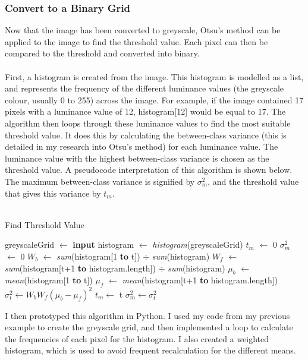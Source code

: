 \documentclass[titlepage]{article}
\begin{document}
\subsubsection{Convert to a Binary Grid}
Now that the image has been converted to greyscale, Otsu's method can be applied to the image to find the threshold value. Each pixel can then be compared to the threshold and converted into binary. 
\\\\
First, a histogram is created from the image. This histogram is modelled as a list, and represents the frequency of the different luminance values (the greyscale colour, usually 0 to 255) across the image. For example, if the image contained 17 pixels with a luminance value of 12, histogram[12] would be equal to 17. The algorithm then loops through these luminance values to find the most suitable threshold value. It does this by calculating the between-class variance (this is detailed in my research into Otsu's method) for each luminance value. The luminance value with the highest between-class variance is chosen as the threshold value. A pseudocode interpretation of this algorithm is shown below. The maximum between-class variance is signified by $\sigma_m^2$, and the threshold value that gives this variance by $t_m$.
\\\\
\begin{algorithm}[H]
\caption{Find Threshold Value}
\begin{algorithmic}[1]
	\State greyscaleGrid $\gets$ \textbf{input}
    	\State histogram $\gets$ \textit{histogram}(greyscaleGrid)
    	\State $t_m$ $\gets$ 0
    	\State $\sigma_m^2$ $\gets$ 0
    		\State $W_b$ $\gets$ \textit{sum}(histogram[1 \textbf{to} t]) $\div$ \textit{sum}(histogram)
    		\State $W_f$ $\gets$ \textit{sum}(histogram[t+1 \textbf{to} histogram.length]) $\div$ \textit{sum}(histogram)
    		\State $\mu_b$ $\gets$ \textit{mean}(histogram[1 \textbf{to} t])
    		\State $\mu_f$ $\gets$ \textit{mean}(histogram[t+1 \textbf{to} histogram.length])
		\State $\sigma_t^2 \gets W_b W_f (\mu_b - \mu_f)^2$
        			\State $t_m \gets$ t
			\State $\sigma_m^2 \gets \sigma_t^2$
        		\EndIf
    	\EndFor
\end{algorithmic}
\end{algorithm}
 
I then prototyped this algorithm in Python. I used my code from my previous example to create the greyscale grid, and then implemented a loop to calculate the frequencies of each pixel for the histogram. I also created a weighted histogram, which is used to avoid frequent recalculation for the different means. 
\end{document}
